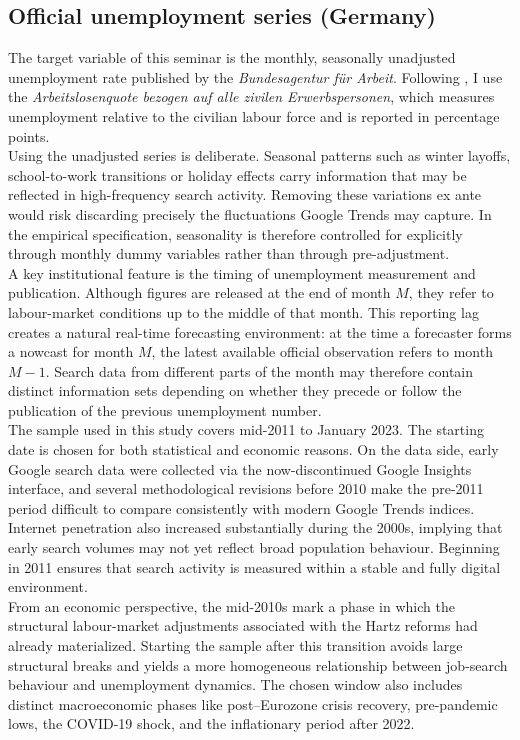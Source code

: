 \documentclass[12pt,a4paper]{article}
\begin{document}
\subsection{Official unemployment series (Germany)}
The target variable of this seminar is the monthly, seasonally unadjusted unemployment rate published by the \textit{Bundesagentur für Arbeit}. Following \citet{Askitas} , I use the \textit{Arbeitslosenquote bezogen auf alle zivilen Erwerbspersonen}, which measures unemployment relative to the civilian labour force and is reported in percentage points.\\
Using the unadjusted series is deliberate. Seasonal patterns such as winter layoffs, school-to-work transitions or holiday effects carry information that may be reflected in high-frequency search activity. Removing these variations ex ante would risk discarding precisely the fluctuations Google Trends may capture. In the empirical specification, seasonality is therefore controlled for explicitly through monthly dummy variables rather than through pre-adjustment.\\
A key institutional feature is the timing of unemployment measurement and publication. Although figures are released at the end of month $M$, they refer to labour-market conditions up to the middle of that month. This reporting lag creates a natural real-time forecasting environment: at the time a forecaster forms a nowcast for month $M$, the latest available official observation refers to month $M-1$. 
Search data from different parts of the month may therefore contain distinct information sets depending on whether they precede or follow the publication of the previous unemployment number.\\
The sample used in this study covers mid-2011 to January 2023. The starting date is chosen for both statistical and economic reasons. On the data side, early Google search data were collected via the now-discontinued Google Insights interface, and several methodological revisions before 2010 make the pre-2011 period difficult to compare consistently with modern Google Trends indices. Internet penetration also increased substantially during the 2000s, implying that early search volumes may not yet reflect broad population behaviour. Beginning in 2011 ensures that search activity is measured within a stable and fully digital environment. \\
From an economic perspective, the mid-2010s mark a phase in which the structural labour-market adjustments associated with the Hartz reforms had already materialized. Starting the sample after this transition avoids large structural breaks and yields a more homogeneous relationship between job-search behaviour and unemployment dynamics. The chosen window also includes distinct macroeconomic phases like post–Eurozone crisis recovery, pre-pandemic lows, the COVID-19 shock, and the inflationary period after 2022.
\end{document}
